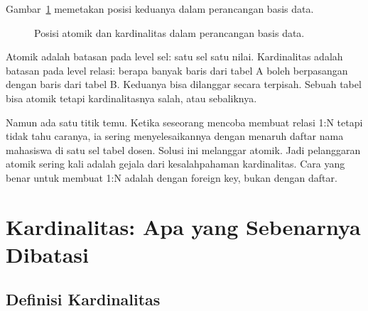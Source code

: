 \documentclass[11pt,a4paper]{article}
\begin{document}
Gambar~\ref{fig:tree} memetakan posisi keduanya dalam perancangan basis data.

\begin{figure}[H]
	\centering
	\caption{Posisi atomik dan kardinalitas dalam perancangan basis data.}
	\label{fig:tree}
\end{figure}

Atomik adalah batasan pada level sel: satu sel satu nilai. Kardinalitas adalah batasan pada level relasi: berapa banyak baris dari tabel A boleh berpasangan dengan baris dari tabel B. Keduanya bisa dilanggar secara terpisah. Sebuah tabel bisa atomik tetapi kardinalitasnya salah, atau sebaliknya.

Namun ada satu titik temu. Ketika seseorang mencoba membuat relasi 1:N tetapi tidak tahu caranya, ia sering menyelesaikannya dengan menaruh daftar nama mahasiswa di satu sel tabel dosen. Solusi ini melanggar atomik. Jadi pelanggaran atomik sering kali adalah gejala dari kesalahpahaman kardinalitas. Cara yang benar untuk membuat 1:N adalah dengan foreign key, bukan dengan daftar.

\section{Kardinalitas: Apa yang Sebenarnya Dibatasi}

\subsection{Definisi Kardinalitas}
\end{document}
